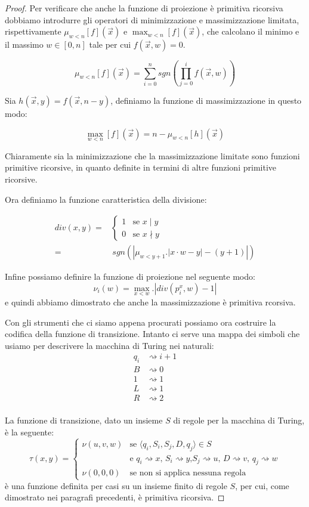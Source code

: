 \begin{proof}
Per verificare che anche la funzione di proiezione è primitiva ricorsiva
dobbiamo introdurre gli operatori di minimizzazione e massimizzazione limitata,
rispettivamente $\mu_{w<n}[f](\overrightarrow{x})$ e
$\max_{w<n}[f](\overrightarrow{x})$, che calcolano il minimo e il massimo $w
\in [0,n]$ tale per cui $f(\overrightarrow{x}, w) = 0$.

$$\mu_{w<n}[f](\overrightarrow{x}) = \sum_{i=0}^n sgn\left(\prod_{j=0}^i
f(\overrightarrow{x},w)\right)$$

Sia $h(\overrightarrow{x},y) = f(\overrightarrow{x},n-y)$, definiamo la
funzione di massimizzazione in questo modo:

$$\max_{w<n}[f](\overrightarrow{x}) = n-\mu_{w<n}[h](\overrightarrow{x})$$

Chiaramente sia la minimizzazione che la massimizzazione limitate sono funzioni
primitive ricorsive, in quanto definite in termini di altre funzioni primitive
ricorsive.

Ora definiamo la funzione caratteristica della divisione:

\begin{align*}
div(x,y) =& \left\{
\begin{array}{ll}
1 & \text{se } x \mid y\\
0 & \text{se } x \nmid y
\end{array}
\right. \\
=& \, sgn\left( \left| \mu_{w<y+1}.\left|x \cdot w - y \right| - (y+1)\right|
\right)
\end{align*}

Infine possiamo definire la funzione di proiezione nel seguente modo:
$$\nu_i(w) = \max_{x<w}.\left| div(p_i^x, w) - 1\right|$$
e quindi abbiamo dimostrato che anche la massimizzazione è primitiva rcorsiva.

Con gli strumenti che ci siamo appena procurati possiamo ora costruire la
codifica della funzione di transizione. Intanto ci serve una mappa dei simboli
che usiamo per descrivere la macchina di Turing nei naturali:
\begin{align*}
q_i &\rightsquigarrow i+1\\
B &\rightsquigarrow 0\\
1 &\rightsquigarrow 1\\
L &\rightsquigarrow 1\\
R &\rightsquigarrow 2\\
\end{align*}

La funzione di transizione, dato un insieme $S$ di regole per la macchina di
Turing, è la seguente:
$$\tau(x,y) = \left\{
\begin{array}{ll}
\nu(u,v,w) & \text{se $\langle q_i, S_i, S_j, D, q_j \rangle \in S$}\\
& \text{e $q_i \rightsquigarrow x$, $S_i \rightsquigarrow y$,
$S_j \rightsquigarrow u$, $D \rightsquigarrow v$, $q_j \rightsquigarrow w$}\\
\nu(0,0,0) & \text{se non si applica nessuna regola}
\end{array}
\right.$$
è una funzione definita per casi su un insieme finito di regole $S$, per cui,
come dimostrato nei paragrafi precedenti, è primitiva ricorsiva.


\end{proof}
